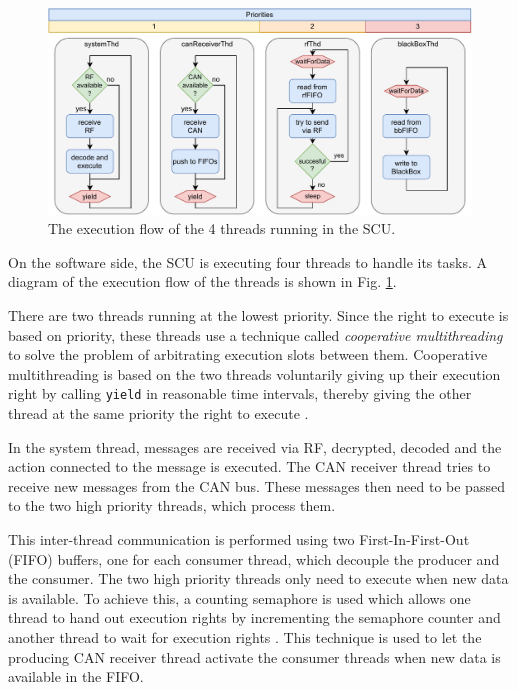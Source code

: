 \documentclass[a4paper,conference]{IEEEtran}
\begin{document}
\begin{figure}
    \centering
    \includegraphics[width=\linewidth]{documentation/images/SCU_threads.pdf}
    \caption{The execution flow of the 4 threads running in the SCU.}
    \label{fig:SCU_threads}
\end{figure}

On the software side, the SCU is executing four threads to handle its tasks. A diagram of the execution flow of the threads is shown in Fig. \ref{fig:SCU_threads}. 

There are two threads running at the lowest priority. Since the right to execute is based on priority, these threads use a technique called \textit{cooperative multithreading} to solve the problem of arbitrating execution slots between them. Cooperative multithreading is based on the two threads voluntarily giving up their execution right by calling \texttt{yield} in reasonable time intervals, thereby giving the other thread at the same priority the right to execute \cite{chibiOsYield}.

In the system thread, messages are received via RF, decrypted, decoded and the action connected to the message is executed. The CAN receiver thread tries to receive new messages from the CAN bus. These messages then need to be passed to the two high priority threads, which process them.

This inter-thread communication is performed using two First-In-First-Out (FIFO) buffers, one for each consumer thread, which decouple the producer and the consumer. The two high priority threads only need to execute when new data is available. To achieve this, a counting semaphore is used which allows one thread to hand out execution rights by incrementing the semaphore counter and another thread to wait for execution rights \cite{chibiOsSemaphore}. This technique is used to let the producing CAN receiver thread activate the consumer threads when new data is available in the FIFO.
\end{document}
